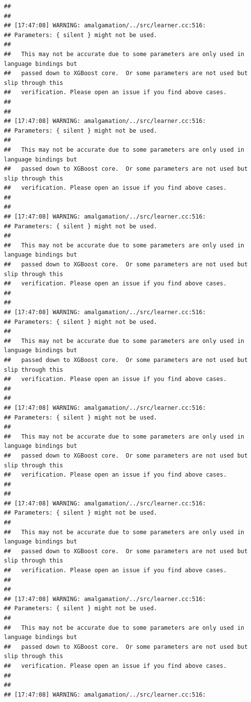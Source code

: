 \documentclass[AMS,STIX2COL]{WileyNJD-v2}\usepackage[]{graphicx}\usepackage[]{color}
\makeatletter
\newenvironment{kframe}{%
 \def\at@end@of@kframe{}%
 \ifinner\ifhmode%
  \def\at@end@of@kframe{\end{minipage}}%
  \begin{minipage}{\columnwidth}%
 \fi\fi%
 \def\FrameCommand##1{\hskip\@totalleftmargin \hskip-\fboxsep
 \colorbox{shadecolor}{##1}\hskip-\fboxsep
     \hskip-\linewidth \hskip-\@totalleftmargin \hskip\columnwidth}%
 \MakeFramed {\advance\hsize-\width
   \@totalleftmargin\z@ \linewidth\hsize
   \@setminipage}}%
 {\par\unskip\endMakeFramed%
 \at@end@of@kframe}
\newenvironment{knitrout}{}{} %
\makeatother
\begin{document}
\begin{knitrout}
\begin{kframe}
\begin{verbatim}
## 
## 
## [17:47:08] WARNING: amalgamation/../src/learner.cc:516: 
## Parameters: { silent } might not be used.
## 
##   This may not be accurate due to some parameters are only used in language bindings but
##   passed down to XGBoost core.  Or some parameters are not used but slip through this
##   verification. Please open an issue if you find above cases.
## 
## 
## [17:47:08] WARNING: amalgamation/../src/learner.cc:516: 
## Parameters: { silent } might not be used.
## 
##   This may not be accurate due to some parameters are only used in language bindings but
##   passed down to XGBoost core.  Or some parameters are not used but slip through this
##   verification. Please open an issue if you find above cases.
## 
## 
## [17:47:08] WARNING: amalgamation/../src/learner.cc:516: 
## Parameters: { silent } might not be used.
## 
##   This may not be accurate due to some parameters are only used in language bindings but
##   passed down to XGBoost core.  Or some parameters are not used but slip through this
##   verification. Please open an issue if you find above cases.
## 
## 
## [17:47:08] WARNING: amalgamation/../src/learner.cc:516: 
## Parameters: { silent } might not be used.
## 
##   This may not be accurate due to some parameters are only used in language bindings but
##   passed down to XGBoost core.  Or some parameters are not used but slip through this
##   verification. Please open an issue if you find above cases.
## 
## 
## [17:47:08] WARNING: amalgamation/../src/learner.cc:516: 
## Parameters: { silent } might not be used.
## 
##   This may not be accurate due to some parameters are only used in language bindings but
##   passed down to XGBoost core.  Or some parameters are not used but slip through this
##   verification. Please open an issue if you find above cases.
## 
## 
## [17:47:08] WARNING: amalgamation/../src/learner.cc:516: 
## Parameters: { silent } might not be used.
## 
##   This may not be accurate due to some parameters are only used in language bindings but
##   passed down to XGBoost core.  Or some parameters are not used but slip through this
##   verification. Please open an issue if you find above cases.
## 
## 
## [17:47:08] WARNING: amalgamation/../src/learner.cc:516: 
## Parameters: { silent } might not be used.
## 
##   This may not be accurate due to some parameters are only used in language bindings but
##   passed down to XGBoost core.  Or some parameters are not used but slip through this
##   verification. Please open an issue if you find above cases.
## 
## 
## [17:47:08] WARNING: amalgamation/../src/learner.cc:516: 

\end{verbatim}
\end{kframe}
\end{knitrout}
\end{document}
